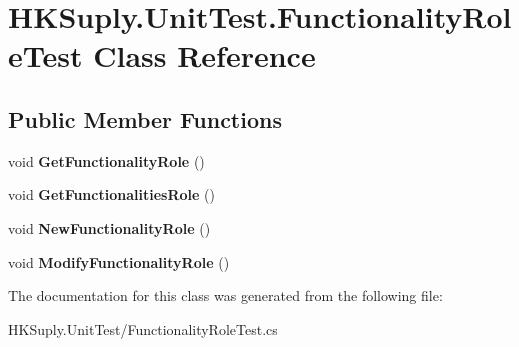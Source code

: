 \hypertarget{class_h_k_suply_1_1_unit_test_1_1_functionality_role_test}{}\section{H\+K\+Suply.\+Unit\+Test.\+Functionality\+Role\+Test Class Reference}
\label{class_h_k_suply_1_1_unit_test_1_1_functionality_role_test}
\subsection*{Public Member Functions}
\begin{DoxyCompactItemize}
\item 
\mbox{\label{class_h_k_suply_1_1_unit_test_1_1_functionality_role_test_a6be3df22cff2086d466362562a424849}} 
void {\bfseries Get\+Functionality\+Role} ()
\item 
\mbox{\label{class_h_k_suply_1_1_unit_test_1_1_functionality_role_test_a2939d4000f716e0577656a9526322edb}} 
void {\bfseries Get\+Functionalities\+Role} ()
\item 
\mbox{\label{class_h_k_suply_1_1_unit_test_1_1_functionality_role_test_a044c261bef5cd0575d11799bd86961af}} 
void {\bfseries New\+Functionality\+Role} ()
\item 
\mbox{\label{class_h_k_suply_1_1_unit_test_1_1_functionality_role_test_a7fd10863dba59d604f1bf79382901267}} 
void {\bfseries Modify\+Functionality\+Role} ()
\end{DoxyCompactItemize}


The documentation for this class was generated from the following file\+:\begin{DoxyCompactItemize}
\item 
H\+K\+Suply.\+Unit\+Test/Functionality\+Role\+Test.\+cs\end{DoxyCompactItemize}
